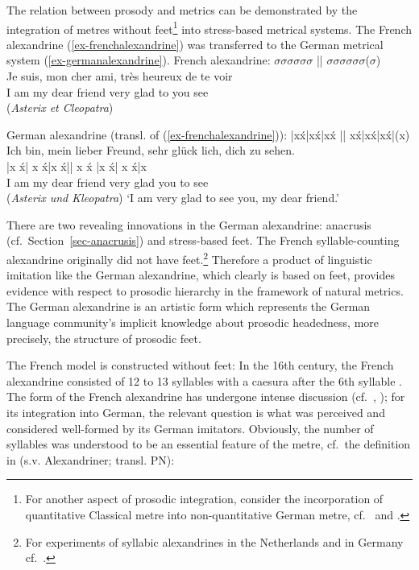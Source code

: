 \documentclass[output=paper
  ,nobabel
  ,uniformtopskip %
]{langscibook}
\begin{document}
The relation between prosody and metrics can be demonstrated by the integration of metres without feet\footnote{For another aspect of prosodic integration, consider the incorporation of quantitative Classical metre into non-quantitative German metre, cf.\ \eg \citet{Wackernagel1831} and \citet{NoelAzizHanna2008b}.} into stress-based metrical systems. The French alexandrine (\ref{ex-frenchalexandrine}) was transferred to the German metrical system (\ref{ex-germanalexandrine}).
\eal
\ex\label{ex-frenchalexandrine}
 French alexandrine:  ${\sigma}{\sigma}{\sigma}{\sigma}{\sigma}{\sigma}$ ||  ${\sigma}{\sigma}{\sigma}{\sigma}{\sigma}{\sigma}$(${\sigma}$)\\
\gll Je  suis,  mon  cher  ami,    très  heureux    de  te  voir\\
     I  am  my  dear  friend    very  glad    to  you  see\\
\glt (\textit{Asterix et Cleopatra})

\ex\label{ex-germanalexandrine}
 German alexandrine (transl. of (\ref{ex-frenchalexandrine})): |x\'{x}|x\'{x}|x\'{x} || x\'{x}|x\'{x}|x\'{x}|(x)\\
\glll Ich  bin,  mein  lieber  Freund,    sehr  glück  lich,  dich  zu  sehen.\\
      |x  \'{x}|  x  \'{x}|x  \'{x}\hspace{25pt}||  x  \'{x} |x  \'{x}|  x  \'{x}|x\\
      I  am  my  dear  friend    very  glad  {}  you  to  see\\
\glt (\textit{Asterix und Kleopatra})
\glt `I am very glad to see you, my dear friend.'
\zl 

\noindent
There are two revealing innovations in the German alexandrine: anacrusis (cf.~Section~\ref{sec-anacrusis}) and stress-based feet. The French syllable-counting alexandrine originally did not have feet.\footnote{For experiments of syllabic alexandrines in the Netherlands and in Germany cf.\ \citet*[192-197]{Gasparov1996}.} Therefore a product of linguistic imitation like the German alexandrine, which clearly is based on feet, provides evidence with respect to prosodic hierarchy in the framework of natural metrics. The German alexandrine is an artistic form which represents the German language community's implicit knowledge about prosodic headedness, more precisely, the structure of prosodic feet. 

\largerpage
The French model is constructed without feet: In the 16th century, the French alexandrine consisted of 12 to 13 syllables with a caesura after the 6th syllable \citep[107]{Coenen1998}. The form of the French alexandrine has undergone intense discussion (cf.\ \eg \citealt{Bunia2014}, \citealt{Dufter2010}); for its integration into German, the relevant question is what was perceived and considered well-formed by its German imitators. Obviously, the number of syllables was understood to be an essential feature of the metre, cf.\ the definition in \citealt{Wagenknecht2007} (s.v. Alexandriner; transl. PN):
\end{document}
